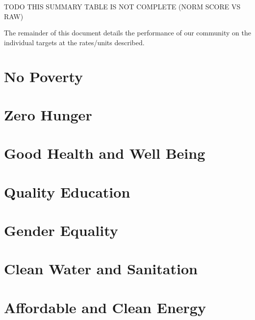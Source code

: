 \documentclass[12pt]{article}
\begin{document}
TODO THIS SUMMARY TABLE IS NOT COMPLETE (NORM SCORE VS RAW)




The remainder of this document details the performance of our community on the individual targets at the rates/units described.


\clearpage
\section{No Poverty}  %



\section{Zero Hunger}



\section{Good Health and Well Being}



\section{Quality Education}



\section{Gender Equality}



\section{Clean Water and Sanitation}



\section{Affordable and Clean Energy}


\end{document}
